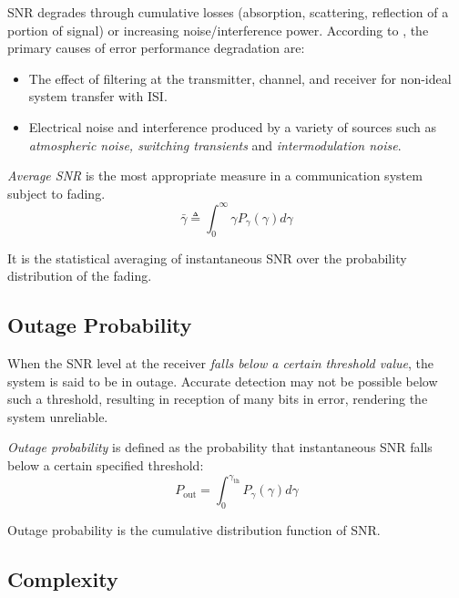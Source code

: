 SNR degrades through cumulative losses (absorption, scattering, reflection of a portion of signal) or increasing noise/interference power. 
According to \cite{AWGN}, the primary causes of error performance degradation are:
\begin{itemize}
	\item The effect of filtering at the transmitter, channel, and receiver for non-ideal system transfer with \gls{ISI}.
\item Electrical noise and interference produced by a variety of sources such as \emph{atmospheric noise, switching transients} and \emph{intermodulation noise}.
\end{itemize}
\emph{Average \gls{SNR}} is the most appropriate measure in a communication system subject to fading.
\begin{equation}
	\bar{\gamma} \triangleq \int_0^\infty \gamma P_\gamma (\gamma) d\gamma
\end{equation}
\begin{mathDef}
\end{mathDef}
It is the statistical averaging of instantaneous SNR over the probability distribution of the fading.

\subsection{Outage Probability}
When the \gls{SNR} level at the receiver \emph{falls below a certain threshold value}, the system is said to be in outage. Accurate detection may not be possible below such a threshold, resulting in reception of many bits in error, rendering the system unreliable\cite{MIMO}.

\emph{Outage probability} is defined as the probability that instantaneous SNR falls below a certain specified threshold:
\begin{equation}
	P_{\text{out}} = \int_0^{\gamma_{\text{th}}} P_\gamma (\gamma) d\gamma
\end{equation}
\begin{mathDef}
\end{mathDef}
Outage probability is the cumulative distribution function of SNR.

\subsection{Complexity}
